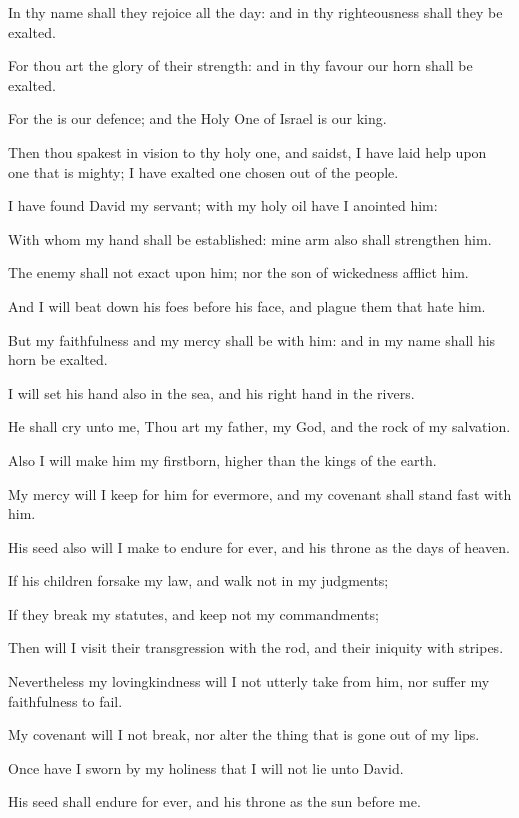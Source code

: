 \verse In thy name shall they rejoice all the day: and in thy righteousness shall they be exalted.

\verse For thou art the glory of their strength: and in thy favour our horn shall be exalted.

\verse For the \LORD is our defence; and the Holy One of Israel is our king.

\verse Then thou spakest in vision to thy holy one, and saidst, I have laid help upon one that is mighty; I have exalted one chosen out of the people.

\verse I have found David my servant; with my holy oil have I anointed him:

\verse With whom my hand shall be established: mine arm also shall strengthen him.

\verse The enemy shall not exact upon him; nor the son of wickedness afflict him.

\verse And I will beat down his foes before his face, and plague them that hate him.

\verse But my faithfulness and my mercy shall be with him: and in my name shall his horn be exalted.

\verse I will set his hand also in the sea, and his right hand in the rivers.

\verse He shall cry unto me, Thou art my father, my God, and the rock of my salvation.

\verse Also I will make him my firstborn, higher than the kings of the earth.

\verse My mercy will I keep for him for evermore, and my covenant shall stand fast with him.

\verse His seed also will I make to endure for ever, and his throne as the days of heaven.

\verse If his children forsake my law, and walk not in my judgments;

\verse If they break my statutes, and keep not my commandments;

\verse Then will I visit their transgression with the rod, and their iniquity with stripes.

\verse Nevertheless my lovingkindness will I not utterly take from him, nor suffer my faithfulness to fail.

\verse My covenant will I not break, nor alter the thing that is gone out of my lips.

\verse Once have I sworn by my holiness that I will not lie unto David.

\verse His seed shall endure for ever, and his throne as the sun before me.

